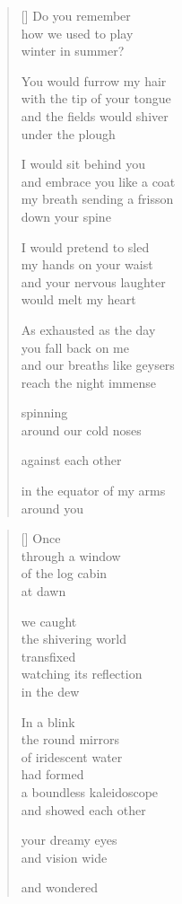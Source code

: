 \documentclass[12pt,a4paper]{article}
\begin{document}
\begin{verse}[\versewidth]
  Do you remember \\
  how we used to play \\
  winter in summer?

  You would furrow my hair \\
  with the tip of your tongue \\
  and the fields would shiver \\
  under the plough

  I would sit behind you \\
  and embrace you like a coat \\
  my breath sending a frisson \\
  down your spine

  I would pretend to sled \\
  my hands on your waist \\
  and your nervous laughter \\
  would melt my heart

  As exhausted as the day \\
  you fall back on me \\
  and our breaths like geysers \\
  reach the night immense

  spinning \\
  around our cold noses

  against each other

  in the equator of my arms \\
  around you
\end{verse}


\newpage

\poemtitle{}

\settowidth{\versewidth}{the infinite kaleidoscope}

\bigskip

\begin{verse}[\versewidth]
  Once \\
  through a window \\
  of the log cabin \\
  at dawn

  we caught \\
  the shivering world \\
  transfixed \\
  watching its reflection \\
  in the dew

  In a blink \\
  the round mirrors \\
  of iridescent water \\
  had formed \\
  a boundless kaleidoscope \\
  and showed each other

  your dreamy eyes \\
  and vision wide

  and wondered
\end{verse}
\end{document}
